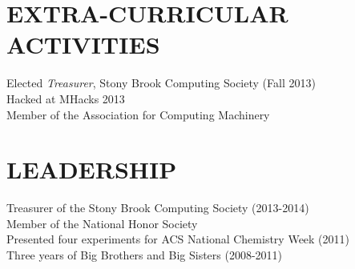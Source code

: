 \documentclass[margin]{res}
\begin{document}
\begin{resume}
\section{EXTRA-CURRICULAR \\ ACTIVITIES}             
            Elected {\it Treasurer}, Stony Brook Computing Society (Fall 2013) \\
            Hacked at MHacks 2013 \\
            Member of the Association for Computing Machinery
 
\section{LEADERSHIP}

            Treasurer of the Stony Brook Computing Society (2013-2014)\\
            Member of the National Honor Society \\
            Presented four experiments for ACS National Chemistry Week (2011) \\
            Three years of Big Brothers and Big Sisters (2008-2011)

\end{resume}
\end{document}
